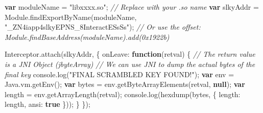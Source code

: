 \documentclass[
]{article}
\newenvironment{Shaded}{}{}
\newcommand{\AttributeTok}[1]{\textcolor[rgb]{0.49,0.56,0.16}{#1}}
\newcommand{\BuiltInTok}[1]{\textcolor[rgb]{0.00,0.50,0.00}{#1}}
\newcommand{\CommentTok}[1]{\textcolor[rgb]{0.38,0.63,0.69}{\textit{#1}}}
\newcommand{\DataTypeTok}[1]{\textcolor[rgb]{0.56,0.13,0.00}{#1}}
\newcommand{\FunctionTok}[1]{\textcolor[rgb]{0.02,0.16,0.49}{#1}}
\newcommand{\KeywordTok}[1]{\textcolor[rgb]{0.00,0.44,0.13}{\textbf{#1}}}
\newcommand{\NormalTok}[1]{#1}
\newcommand{\OperatorTok}[1]{\textcolor[rgb]{0.40,0.40,0.40}{#1}}
\newcommand{\StringTok}[1]{\textcolor[rgb]{0.25,0.44,0.63}{#1}}
\begin{document}
\begin{Shaded}
\begin{Highlighting}[]
\KeywordTok{var}\NormalTok{ moduleName }\OperatorTok{=} \StringTok{"libxxxx.so"}\OperatorTok{;} \CommentTok{// Replace with your .so name}
\KeywordTok{var}\NormalTok{ slkyAddr }\OperatorTok{=}\NormalTok{ Module}\OperatorTok{.}\FunctionTok{findExportByName}\NormalTok{(moduleName}\OperatorTok{,} \StringTok{"\_ZN4iapp4slkyEPNS\_8InteractESsSs"}\NormalTok{)}\OperatorTok{;} 
\CommentTok{// Or use the offset: Module.findBaseAddress(moduleName).add(0x1922b)}

\NormalTok{Interceptor}\OperatorTok{.}\FunctionTok{attach}\NormalTok{(slkyAddr}\OperatorTok{,}\NormalTok{ \{}
    \DataTypeTok{onLeave}\OperatorTok{:} \KeywordTok{function}\NormalTok{(retval) \{}
        \CommentTok{// The return value is a JNI Object (jbyteArray)}
        \CommentTok{// We can use JNI to dump the actual bytes of the final key}
        \BuiltInTok{console}\OperatorTok{.}\FunctionTok{log}\NormalTok{(}\StringTok{"FINAL SCRAMBLED KEY FOUND!"}\NormalTok{)}\OperatorTok{;}
        \KeywordTok{var}\NormalTok{ env }\OperatorTok{=}\NormalTok{ Java}\OperatorTok{.}\AttributeTok{vm}\OperatorTok{.}\FunctionTok{getEnv}\NormalTok{()}\OperatorTok{;}
        \KeywordTok{var}\NormalTok{ bytes }\OperatorTok{=}\NormalTok{ env}\OperatorTok{.}\FunctionTok{getByteArrayElements}\NormalTok{(retval}\OperatorTok{,} \KeywordTok{null}\NormalTok{)}\OperatorTok{;}
        \KeywordTok{var}\NormalTok{ length }\OperatorTok{=}\NormalTok{ env}\OperatorTok{.}\FunctionTok{getArrayLength}\NormalTok{(retval)}\OperatorTok{;}
        \BuiltInTok{console}\OperatorTok{.}\FunctionTok{log}\NormalTok{(}\FunctionTok{hexdump}\NormalTok{(bytes}\OperatorTok{,}\NormalTok{ \{ }\DataTypeTok{length}\OperatorTok{:}\NormalTok{ length}\OperatorTok{,} \DataTypeTok{ansi}\OperatorTok{:} \KeywordTok{true}\NormalTok{ \}))}\OperatorTok{;}
\NormalTok{    \}}
\NormalTok{\})}\OperatorTok{;}
\end{Highlighting}
\end{Shaded}
\end{document}

